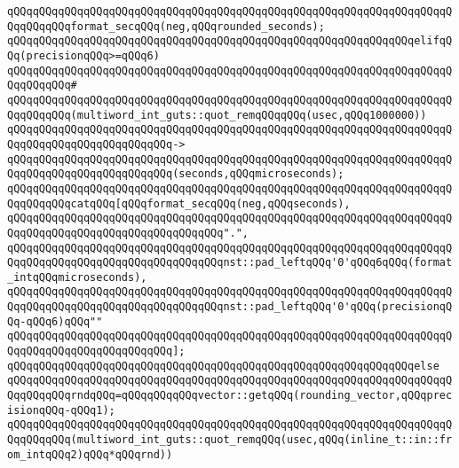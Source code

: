\newline
\verb|qQQqqQQqqQQqqQQqqQQqqQQqqQQqqQQqqQQqqQQqqQQqqQQqqQQqqQQqqQQqqQQqqQQqqQQqqQQqqQQqformat_secqQQq(neg,qQQqrounded_seconds);|\newline
\newline
\verb|qQQqqQQqqQQqqQQqqQQqqQQqqQQqqQQqqQQqqQQqqQQqqQQqqQQqqQQqqQQqqQQqelifqQQq(precisionqQQq>=qQQq6)|\newline
\verb|qQQqqQQqqQQqqQQqqQQqqQQqqQQqqQQqqQQqqQQqqQQqqQQqqQQqqQQqqQQqqQQqqQQqqQQqqQQqqQQq#|\newline
\verb|qQQqqQQqqQQqqQQqqQQqqQQqqQQqqQQqqQQqqQQqqQQqqQQqqQQqqQQqqQQqqQQqqQQqqQQqqQQqqQQq(multiword_int_guts::quot_remqQQqqQQq(usec,qQQq1000000))|\newline
\verb|qQQqqQQqqQQqqQQqqQQqqQQqqQQqqQQqqQQqqQQqqQQqqQQqqQQqqQQqqQQqqQQqqQQqqQQqqQQqqQQqqQQqqQQqqQQqqQQq->|\newline
\verb|qQQqqQQqqQQqqQQqqQQqqQQqqQQqqQQqqQQqqQQqqQQqqQQqqQQqqQQqqQQqqQQqqQQqqQQqqQQqqQQqqQQqqQQqqQQqqQQq(seconds,qQQqmicroseconds);|\newline
\newline
\verb|qQQqqQQqqQQqqQQqqQQqqQQqqQQqqQQqqQQqqQQqqQQqqQQqqQQqqQQqqQQqqQQqqQQqqQQqqQQqqQQqcatqQQq[qQQqformat_secqQQq(neg,qQQqseconds),|\newline
\verb|qQQqqQQqqQQqqQQqqQQqqQQqqQQqqQQqqQQqqQQqqQQqqQQqqQQqqQQqqQQqqQQqqQQqqQQqqQQqqQQqqQQqqQQqqQQqqQQqqQQqqQQq".",|\newline
\verb|qQQqqQQqqQQqqQQqqQQqqQQqqQQqqQQqqQQqqQQqqQQqqQQqqQQqqQQqqQQqqQQqqQQqqQQqqQQqqQQqqQQqqQQqqQQqqQQqqQQqqQQqnst::pad_leftqQQq'0'qQQq6qQQq(format_intqQQqmicroseconds),|\newline
\verb|qQQqqQQqqQQqqQQqqQQqqQQqqQQqqQQqqQQqqQQqqQQqqQQqqQQqqQQqqQQqqQQqqQQqqQQqqQQqqQQqqQQqqQQqqQQqqQQqqQQqqQQqnst::pad_leftqQQq'0'qQQq(precisionqQQq-qQQq6)qQQq""|\newline
\verb|qQQqqQQqqQQqqQQqqQQqqQQqqQQqqQQqqQQqqQQqqQQqqQQqqQQqqQQqqQQqqQQqqQQqqQQqqQQqqQQqqQQqqQQqqQQqqQQq];|\newline
\newline
\verb|qQQqqQQqqQQqqQQqqQQqqQQqqQQqqQQqqQQqqQQqqQQqqQQqqQQqqQQqqQQqqQQqelse|\newline
\newline
\verb|qQQqqQQqqQQqqQQqqQQqqQQqqQQqqQQqqQQqqQQqqQQqqQQqqQQqqQQqqQQqqQQqqQQqqQQqqQQqqQQqrndqQQq=qQQqqQQqqQQqvector::getqQQq(rounding_vector,qQQqprecisionqQQq-qQQq1);|\newline
\newline
\verb|qQQqqQQqqQQqqQQqqQQqqQQqqQQqqQQqqQQqqQQqqQQqqQQqqQQqqQQqqQQqqQQqqQQqqQQqqQQqqQQq(multiword_int_guts::quot_remqQQq(usec,qQQq(inline_t::in::from_intqQQq2)qQQq*qQQqrnd))|\newline

